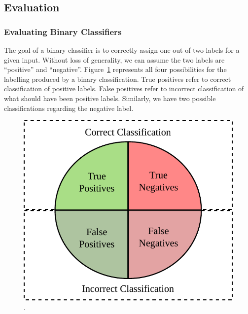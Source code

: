 \subsection{Evaluation}

\subsubsection{Evaluating Binary Classifiers}

The goal of a binary classifier is to correctly assign one out of two labels for a given input.
Without loss of generality, we can assume the two labels are ``positive'' and ``negative''.
Figure~\ref{fig:evaluation-classification} represents all four possibilities for the labelling produced by a binary classification.
True positives refer to correct classification of positive labels.
False positives refer to incorrect classification of what should have been positive labels.
Similarly, we have two possible classifications regarding the negative label.

\begin{figure}[h]
  \centering
  \includegraphics[scale=0.85]{src/background/figs/evaluation-classification.pdf}
  \caption{.}
  \label{fig:evaluation-classification}
\end{figure}

